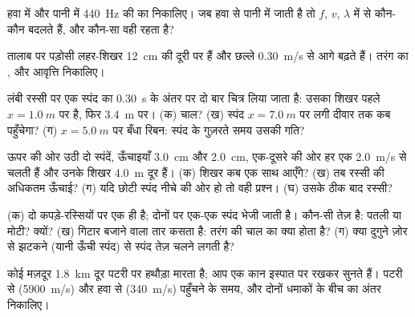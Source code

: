 \begin{exercise}[$\star$]\label{exo:g12:mechanical-waves:4}
हवा में और पानी में \qty{440}{Hz} की  का 
निकालिए। जब  हवा से पानी में जाती है तो $f$, $v$,
$\lambda$ में से कौन-कौन बदलते हैं, और कौन-सा वही रहता है?
\end{exercise}

\begin{exercise}[$\star$]\label{exo:g12:mechanical-waves:5}
तालाब पर पड़ोसी लहर-शिखर \qty{12}{cm} की दूरी पर हैं और छल्ले \qty{0.30}{m/s} से आगे बढ़ते
हैं। तरंग का ,  और
आवृत्ति निकालिए।
\end{exercise}

\begin{exercise}[$\star\star$]\label{exo:g12:mechanical-waves:6}
लंबी रस्सी पर एक स्पंद का \qty{0.30}{s} के अंतर पर दो बार चित्र लिया जाता है: उसका
शिखर पहले $x = \qty{1.0}{m}$ पर है, फिर \qty{3.4}{m} पर। (क) चाल? (ख) स्पंद $x = \qty{7.0}{m}$ पर लगी
दीवार तक कब पहुँचेगा? (ग) $x = \qty{5.0}{m}$ पर बँधा रिबन: स्पंद के गुज़रते समय उसकी
गति?
\end{exercise}

\begin{exercise}[$\star\star$]\label{exo:g12:mechanical-waves:7}
ऊपर की ओर उठी दो स्पंदें, ऊँचाइयाँ \qty{3.0}{cm} और \qty{2.0}{cm}, एक-दूसरे की ओर हर एक
\qty{2.0}{m/s} से चलती हैं और उनके शिखर \qty{4.0}{m} दूर हैं। (क) शिखर कब एक साथ आएँगे?
(ख) तब रस्सी की अधिकतम ऊँचाई? (ग) यदि छोटी स्पंद नीचे की ओर हो तो वही प्रश्न।
(घ) उसके ठीक बाद रस्सी?
\end{exercise}

\begin{exercise}[$\star\star$]\label{exo:g12:mechanical-waves:8}
(क) दो कपड़े-रस्सियों पर एक ही  है; दोनों पर एक-एक स्पंद भेजी
जाती है। कौन-सी तेज़ है: पतली या मोटी? क्यों? (ख) गिटार बजाने वाला
तार कसता है: तरंग की चाल का क्या होता है? (ग) क्या दुगुने ज़ोर से
झटकने (यानी ऊँची स्पंद) से स्पंद तेज़ चलने लगती है?
\end{exercise}

\begin{exercise}[$\star\star$]\label{exo:g12:mechanical-waves:9}
कोई मज़दूर \qty{1.8}{km} दूर पटरी पर हथौड़ा मारता है; आप एक कान इस्पात पर रखकर
सुनते हैं। पटरी से (\qty{5900}{m/s}) और हवा से (\qty{340}{m/s}) पहुँचने के समय, और दोनों
धमाकों के बीच का अंतर निकालिए।
\end{exercise}

